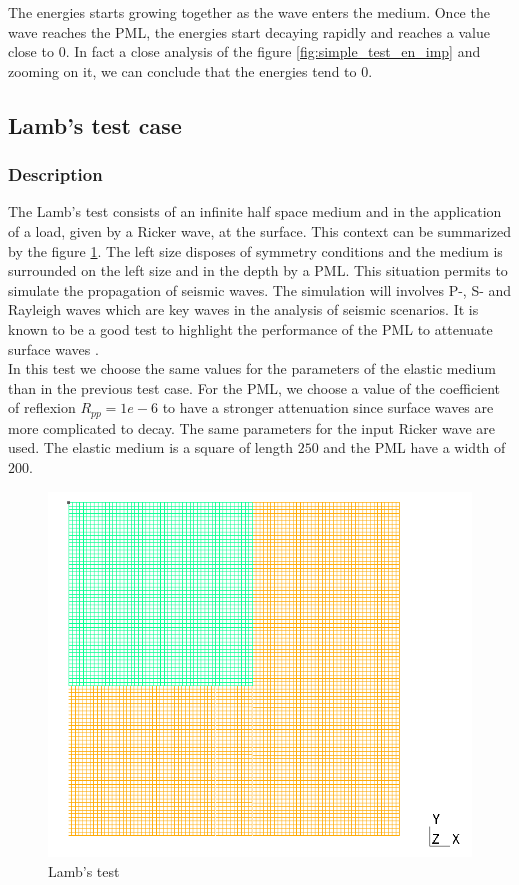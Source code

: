 The energies starts growing together as the wave enters the medium. Once the wave reaches the PML, the energies start decaying rapidly and reaches a value close to $0$. In fact a close analysis of the figure \ref{fig:simple_test_en_imp} and zooming on it, we can conclude that the energies tend to $0$. 

\subsection{Lamb's test case}
\subsubsection{Description}
The Lamb's test consists of an infinite half space medium and in the application of a load, given by a Ricker wave, at the surface. This context can be summarized by the figure \ref{fig:Lamb_test}. The left size disposes of symmetry conditions and the medium is surrounded on the left size and in the depth by a PML. This situation permits to simulate the propagation of seismic waves. The simulation will involves P-, S- and Rayleigh waves which are key waves in the analysis of seismic scenarios. It is known to be a good test to highlight the performance of the PML to attenuate surface waves \cite{Liu2006}. \\
In this test we choose the same values for the parameters of the elastic medium than in the previous test case. For the PML, we choose a value of the coefficient of reflexion $R_{pp} = 1e-6$ to have a stronger attenuation since surface waves are more complicated to decay. The same parameters for the input Ricker wave are used. The elastic medium is a square of length $250$ and the PML have a width of $200$.
\begin{figure}[H]
  \centering
  \includegraphics[scale=0.4]{images/Lamb_test.png}
  \caption{Lamb's test}
  \label{fig:Lamb_test}
\end{figure}    

